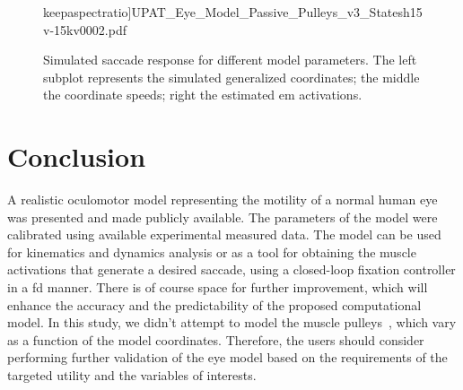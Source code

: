 \documentclass[11pt,a4paper,draft=false]{report}
\begin{document}
\begin{figure}[ht]
{    keepaspectratio]{UPAT_Eye_Model_Passive_Pulleys_v3_Statesh15v-15kv0002.pdf}\label{fig:simulated-saccade-d}}
  \caption{Simulated saccade response for different model parameters. The left
    subplot represents the simulated generalized coordinates; the middle the
    coordinate speeds; right the estimated \gls{em}
    activations.}\label{fig:simulated-saccade}
\end{figure}


\section*{Conclusion}\label{sec:concluison}

A realistic oculomotor model representing the motility of a normal human eye was
presented and made publicly available. The parameters of the model were
calibrated using available experimental measured data. The model can be used for
kinematics and dynamics analysis or as a tool for obtaining the muscle
activations that generate a desired saccade, using a closed-loop fixation
controller in a \gls{fd} manner. There is of course space for further
improvement, which will enhance the accuracy and the predictability of the
proposed computational model. In this study, we didn't attempt to model the
muscle pulleys~\cite{Kono2002a}, which vary as a function of the model
coordinates. Therefore, the users should consider performing further validation
of the eye model based on the requirements of the targeted utility and the
variables of interests.




\end{document}
